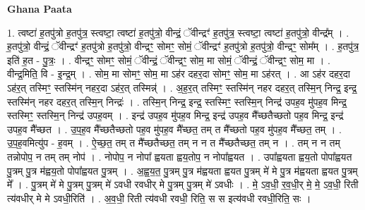 \documentclass[17pt]{extarticle}
\begin{document}
\textbf{Ghana Paata } \newline

1. त्वष्टा॑ ह॒तपु॑त्रो ह॒तपु॑त्र॒ स्त्वष्टा॒ त्वष्टा॑ ह॒तपु॑त्रो॒ वीन्द्रं॒ ॅवीन्द्रꣳ॑ ह॒तपु॑त्र॒ स्त्वष्टा॒ त्वष्टा॑ ह॒तपु॑त्रो॒ वीन्द्र᳚म् । . ह॒तपु॑त्रो॒ वीन्द्रं॒ ॅवीन्द्रꣳ॑ ह॒तपु॑त्रो ह॒तपु॑त्रो॒ वीन्द्रꣳ॒॒ सोमꣳ॒॒ सोमं॒ ॅवीन्द्रꣳ॑ ह॒तपु॑त्रो ह॒तपु॑त्रो॒ वीन्द्रꣳ॒॒ सोम᳚म् । . ह॒तपु॑त्र॒ इति॑ ह॒त - पु॒त्रः॒ । . वीन्द्रꣳ॒॒ सोमꣳ॒॒ सोमं॒ ॅवीन्द्रं॒ ॅवीन्द्रꣳ॒॒ सोम॒ मा सोमं॒ ॅवीन्द्रं॒ ॅवीन्द्रꣳ॒॒ सोम॒ मा । . वीन्द्र॒मिति॒ वि - इ॒न्द्र॒म् । . सोम॒ मा सोमꣳ॒॒ सोम॒ मा ऽह॑र दहर॒दा सोमꣳ॒॒ सोम॒ मा ऽह॑रत् । . आ ऽह॑र दहर॒दा ऽह॑र॒त् तस्मिꣳ॒॒ स्तस्मि॑न् नहर॒दा ऽह॑र॒त् तस्मिन्न्॑ । . अ॒ह॒र॒त् तस्मिꣳ॒॒ स्तस्मि॑न् नहर दहर॒त् तस्मि॒न् निन्द्र॒ इन्द्र॒ स्तस्मि॑न् नहर दहर॒त् तस्मि॒न् निन्द्रः॑ । . तस्मि॒न् निन्द्र॒ इन्द्र॒ स्तस्मिꣳ॒॒ स्तस्मि॒न् निन्द्र॑ उपह॒व मु॑पह॒व मिन्द्र॒ स्तस्मिꣳ॒॒ स्तस्मि॒न् निन्द्र॑ उपह॒वम् । . इन्द्र॑ उपह॒व मु॑पह॒व मिन्द्र॒ इन्द्र॑ उपह॒व मै᳚च्छतैच्छतो पह॒व मिन्द्र॒ इन्द्र॑ उपह॒व मै᳚च्छत । . उ॒प॒ह॒व मै᳚च्छतैच्छतो पह॒व मु॑पह॒व मै᳚च्छत॒ तम् त मै᳚च्छतो पह॒व मु॑पह॒व मै᳚च्छत॒ तम् । . उ॒प॒ह॒वमित्यु॑प - ह॒वम् । . ऐ॒च्छ॒त॒ तम् त मै᳚च्छतैच्छत॒ तम् न न त मै᳚च्छतैच्छत॒ तम् न । . तम् न न तम् तन्नोपोप॒ न तम् तम् नोप॑ । . नोपोप॒ न नोपा᳚ ह्वयता ह्वय॒तोप॒ न नोपा᳚ह्वयत । . उपा᳚ह्वयता ह्वय॒तो पोपा᳚ह्वयत पु॒त्रम् पु॒त्र म॑ह्वय॒तो पोपा᳚ह्वयत पु॒त्रम् । . अ॒ह्व॒य॒त॒ पु॒त्रम् पु॒त्र म॑ह्वयता ह्वयत पु॒त्रम् मे॑ मे पु॒त्र म॑ह्वयता ह्वयत पु॒त्रम् मे᳚ । . पु॒त्रम् मे॑ मे पु॒त्रम् पु॒त्रम् मे॑ ऽवधी रवधीर् मे पु॒त्रम् पु॒त्रम् मे॑ ऽवधीः । . मे॒ ऽव॒धी॒ र॒व॒धी॒र् मे॒ मे॒ ऽव॒धी॒ रिती त्य॑वधीर् मे मे ऽवधी॒रिति॑ । . अ॒व॒धी॒ रिती त्य॑वधी रवधी॒ रिति॒ स स इत्य॑वधी रवधी॒रिति॒ सः । \newline
\end{document}

